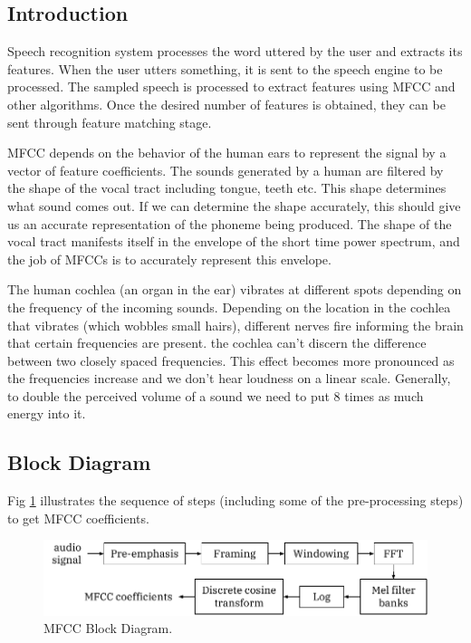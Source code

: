 \documentclass[12pt, a4paper, twoside]{report}
\begin{document}
\subsection{Introduction}
Speech recognition system processes the word uttered by the user and extracts its features. When the user utters something, it is sent to the speech engine to be processed. The sampled speech is processed to extract features using MFCC and other algorithms. Once the desired number of features is obtained, they can be sent through feature matching stage.
\par
MFCC depends on the behavior of the human ears to represent the signal by a vector of feature coefficients. The sounds generated by a human are filtered by the shape of the vocal tract including tongue, teeth etc. This shape determines what sound comes out. If we can determine the shape accurately, this should give us an accurate representation of the phoneme being produced. The shape of the vocal tract manifests itself in the envelope of the short time power spectrum, and the job of MFCCs is to accurately represent this envelope.
\par
The human cochlea (an organ in the ear) vibrates at different spots depending on the frequency of the incoming sounds. Depending on the location in the cochlea that vibrates (which wobbles small hairs), different nerves fire informing the brain that certain frequencies are present.
the cochlea can't discern the difference between two closely spaced frequencies. This effect becomes more pronounced as the frequencies increase and we don't hear loudness on a linear scale. Generally, to double the perceived volume of a sound we need to put 8 times as much energy into it.

\subsection{Block Diagram}
Fig \ref{fig:mfcc} illustrates the sequence of steps (including some of the pre-processing steps) to get MFCC coefficients.
\begin{figure}[!h]
	\centering
	\includegraphics[]
	{images/chapter3/mfcc}
	\caption{MFCC Block Diagram.}
	\label{fig:mfcc}
\end{figure}
\end{document}
